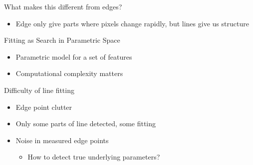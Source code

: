 What makes this different from edges?
\begin{itemize}
    \item Edge only give parts where pixels change rapidly, but lines give us structure
\end{itemize}
Fitting as Search in Parametric Space
\begin{itemize}
    \item Parametric model for a set of features
    \item Computational complexity matters
\end{itemize}
Difficulty of line fitting
\begin{itemize}
    \item Edge point clutter
    \item Only some parts of line detected, some fitting
    \item Noise in measured edge points
    \begin{itemize}
        \item How to detect true underlying parameters?
    \end{itemize}
\end{itemize}
